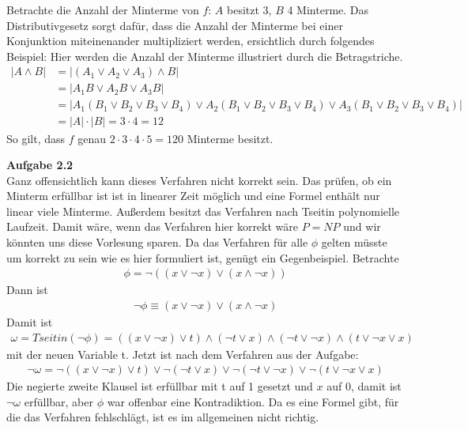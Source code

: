 \documentclass[a4paper,10pt]{article}
\begin{document}
\begin{enumerate}[a)]
Betrachte die Anzahl der Minterme von $f$: $A$ besitzt 3, $B$ 4 Minterme. Das Distributivgesetz sorgt dafür, dass die Anzahl der Minterme bei einer Konjunktion miteinenander multipliziert werden, ersichtlich durch folgendes Beispiel: Hier werden die Anzahl der Minterme illustriert durch die Betragstriche.
\begin{align*}
|A \wedge B| &= |\left(A_1 \vee A_2 \vee A_3\right) \wedge B|\\
&= |A_1B \vee A_2B \vee A_3B|\\
&= |A_1(B_1\vee B_2 \vee B_3 \vee B_4) \vee A_2(B_1\vee B_2 \vee B_3 \vee B_4) \vee A_3(B_1\vee B_2 \vee B_3 \vee B_4)|\\
&= |A| \cdot |B| = 3 \cdot 4 = 12
\end{align*}
So gilt, dass $f$ genau $2\cdot3\cdot4\cdot5=120$ Minterme besitzt. 

\end{enumerate}



\noindent\textbf{Aufgabe 2.2}\\
Ganz offensichtlich kann dieses Verfahren nicht korrekt sein. Das prüfen, ob ein Minterm erfüllbar ist ist in linearer Zeit möglich und eine Formel enthält nur linear viele Minterme. Außerdem besitzt das Verfahren nach Tseitin polynomielle Laufzeit. Damit wäre, wenn das Verfahren hier korrekt wäre $P = NP$ und wir könnten uns diese Vorlesung sparen. Da das Verfahren für alle $\phi$ gelten müsste um korrekt zu sein wie es hier formuliert ist, genügt ein Gegenbeispiel. Betrachte
\begin{align*}
\phi = \neg ((x \vee \neg x) \vee (x \wedge \neg x))
\end{align*} 
Dann ist 
\begin{align*}
\neg \phi \equiv (x \vee \neg x) \vee (x \wedge \neg x)
\end{align*}
Damit ist 
\begin{align*}
\omega = Tseitin(\neg \phi) = ((x \vee \neg x) \vee t) \wedge (\neg t \vee x) \wedge (\neg t \vee \neg x) \wedge (t \vee \neg x \vee x)
\end{align*}
mit der neuen Variable t. Jetzt ist nach dem Verfahren aus der Aufgabe:
\begin{align*}
\neg \omega = \neg((x \vee \neg x) \vee t) \vee \neg(\neg t \vee x) \vee \neg(\neg t \vee \neg x) \vee \neg(t \vee \neg x \vee x)
\end{align*}
Die negierte zweite Klausel ist erfüllbar mit t auf 1 gesetzt und $x$ auf 0, damit ist $\neg \omega$ erfüllbar, aber $\phi$ war offenbar eine Kontradiktion. Da es eine Formel gibt, für die das Verfahren fehlschlägt, ist es im allgemeinen nicht richtig.
\end{document}
